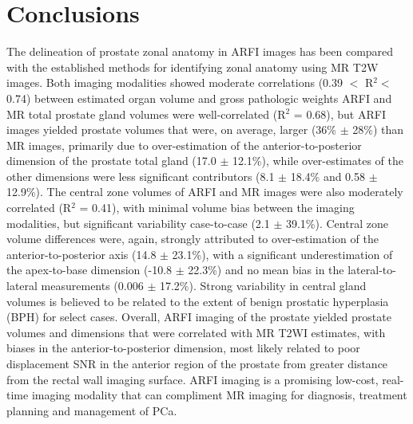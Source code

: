 \section{Conclusions}
The delineation of prostate zonal anatomy in ARFI images has been compared with
the established methods for identifying zonal anatomy using MR T2W images.
Both imaging modalities showed moderate correlations (0.39 $<$ R$^2 < $ 0.74)
between estimated organ volume and gross pathologic weights ARFI and MR total
prostate gland volumes were well-correlated (R$^2$ = 0.68), but ARFI images
yielded prostate volumes that were, on average, larger (36\% $\pm$ 28\%) than
MR images, primarily due to over-estimation of the anterior-to-posterior
dimension of the prostate total gland (17.0 $\pm$ 12.1\%), while over-estimates
of the other dimensions were less significant contributors (8.1 $\pm$ 18.4\%
and 0.58 $\pm$ 12.9\%).  The central zone volumes of ARFI and MR images were
also moderately correlated (R$^2$ = 0.41), with minimal volume bias between the
imaging modalities, but significant variability case-to-case (2.1 $\pm$
39.1\%).  Central zone volume differences were, again, strongly attributed to
over-estimation of the anterior-to-posterior axis (14.8 $\pm$ 23.1\%), with a
significant underestimation of the apex-to-base dimension (-10.8 $\pm$ 22.3\%)
and no mean bias in the lateral-to-lateral measurements (0.006 $\pm$ 17.2\%).
Strong variability in central gland volumes is believed to be related to the
extent of benign prostatic hyperplasia (BPH) for select cases.  Overall, ARFI
imaging of the prostate yielded prostate volumes and dimensions that were
correlated with MR T2WI estimates, with biases in the anterior-to-posterior
dimension, most likely related to poor displacement SNR in the anterior region
of the prostate from greater distance from the rectal wall imaging surface.
ARFI imaging is a promising low-cost, real-time imaging modality that can
compliment MR imaging for diagnosis, treatment planning and management of PCa.
